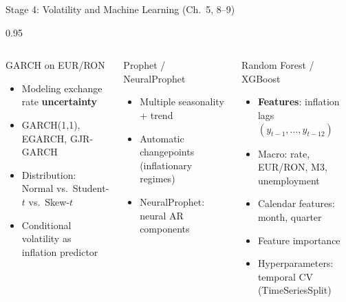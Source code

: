 \documentclass[9pt, aspectratio=169, t]{beamer}
\begin{document}
\begin{frame}{Stage 4: Volatility and Machine Learning (Ch.\ 5, 8--9)}
    \vspace{-0.2cm}
    \begin{cminipage}{0.95\textwidth}
        {\scriptsize
        \begin{columns}[T]
            \begin{block}{GARCH on EUR/RON}
                \begin{itemize}\setlength{\itemsep}{0pt}
                    \item Modeling exchange rate \textbf{uncertainty}
                    \item GARCH(1,1), EGARCH, GJR-GARCH
                    \item Distribution: Normal vs.\ Student-$t$ vs.\ Skew-$t$
                    \item Conditional volatility as inflation predictor
                \end{itemize}
            \end{block}

            \vspace{0.1cm}

            \begin{exampleblock}{Prophet / NeuralProphet}
                \begin{itemize}\setlength{\itemsep}{0pt}
                    \item Multiple seasonality + trend
                    \item Automatic changepoints (inflationary regimes)
                    \item NeuralProphet: neural AR components
                \end{itemize}
            \end{exampleblock}

            \begin{alertblock}{Random Forest / XGBoost}
                \begin{itemize}\setlength{\itemsep}{0pt}
                    \item \textbf{Features}: inflation lags $(y_{t-1}, \ldots, y_{t-12})$
                    \item Macro: rate, EUR/RON, M3, unemployment
                    \item Calendar features: month, quarter
                    \item Feature importance
                    \item Hyperparameters: temporal CV (TimeSeriesSplit)
                \end{itemize}
            \end{alertblock}


\end{columns}}
\end{cminipage}
\end{frame}
\end{document}
